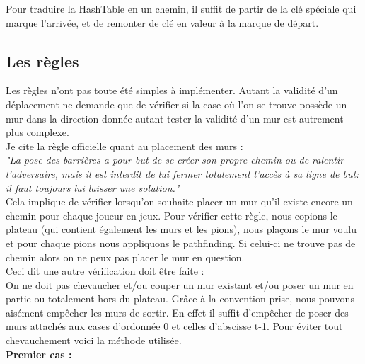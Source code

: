 \documentclass[a4paper, 12pt]{article}
\begin{document}
Pour traduire la HashTable en un chemin, il suffit de partir de la clé spéciale qui marque l'arrivée, et de remonter de clé en valeur à la marque de départ.

\subsection{Les règles}
Les règles n'ont pas toute été simples à implémenter. Autant la validité d'un déplacement ne demande que de vérifier si la case où l'on se trouve possède un mur dans la direction donnée autant tester la validité d'un mur est autrement plus complexe. \\

Je cite la règle officielle quant au placement des murs : \\
\textit{"La pose des barrières a pour but de se créer son propre chemin ou de ralentir l’adversaire, mais il est interdit de lui fermer totalement l’accès à sa ligne de but: il faut toujours lui laisser une solution."} \\

Cela implique de vérifier lorsqu'on souhaite placer un mur qu'il existe encore un chemin pour chaque joueur en jeux. Pour vérifier cette règle, nous copions le plateau (qui contient également les murs et les pions), nous plaçons le mur voulu et pour chaque pions nous appliquons le pathfinding. Si celui-ci ne trouve pas de chemin alors on ne peux pas placer le mur en question.\\
Ceci dit une autre vérification doit être faite : \\

On ne doit pas chevaucher et/ou couper un mur existant et/ou poser un mur en partie ou totalement hors du plateau.
Grâce à la convention prise, nous pouvons aisément empêcher les murs de sortir. En effet il suffit d'empêcher de poser des murs attachés aux cases d'ordonnée 0 et celles d'abscisse t-1. Pour éviter tout chevauchement voici la méthode utilisée.\\
\textbf{Premier cas :} \\
\end{document}
